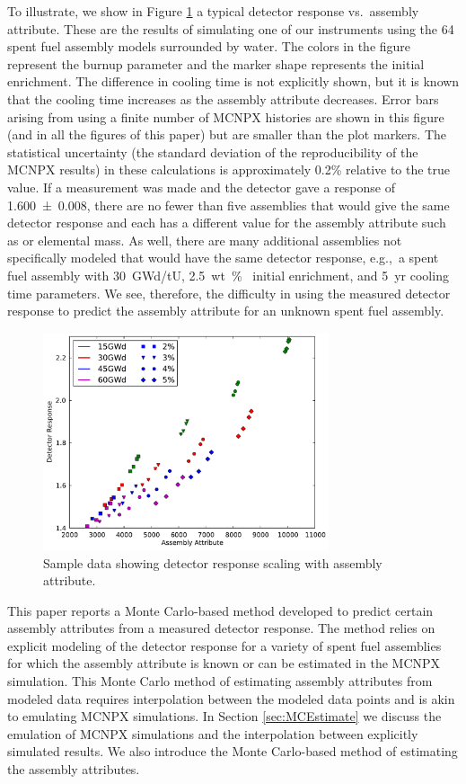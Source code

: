 \documentclass{ansnse}
\begin{document}
To illustrate, we show in Figure \ref{fig:Example} a typical detector response vs.\ assembly attribute.  These are the results of simulating one of our instruments using the 64 spent fuel assembly models surrounded by water.  The colors in the figure represent the burnup parameter and the marker shape represents the initial enrichment.  The difference in cooling time is not explicitly shown, but it is known that the cooling time increases as the assembly attribute decreases.  Error bars arising from using a finite number of MCNPX histories are shown in this figure (and in all the figures of this paper) but are smaller than the plot markers.  The statistical uncertainty (the standard deviation of the reproducibility of the MCNPX results) in these calculations is approximately 0.2\% relative to the true value.  If a measurement was made and the detector gave a response of \num{1.600(8)}, there are no fewer than five assemblies that would give the same detector response and each has a different value for the assembly attribute such as  or elemental  mass.  As well, there are many additional assemblies not specifically modeled that would have the same detector response, e.g.,\ a spent fuel assembly with \SI{30}{GWd/tU}, \SI{2.5}{wt \% } initial enrichment, and \SI{5}{yr} cooling time parameters.  We see, therefore, the difficulty in using the measured detector response to predict the assembly attribute for an unknown spent fuel assembly.
\begin{figure}[h]\centering
    \includegraphics[width=0.75\textwidth, keepaspectratio]{Figures/Plain/PNARH2O}
    \caption{Sample data showing detector response scaling with assembly attribute.}
    \label{fig:Example}
\end{figure}

This paper reports a Monte Carlo-based method developed to predict certain assembly attributes from a measured detector response.  The method relies on explicit modeling of the detector response for a variety of spent fuel assemblies for which the assembly attribute is known or can be estimated in the MCNPX simulation.  This Monte Carlo method of estimating assembly attributes from modeled data requires interpolation between the modeled data points and is akin to emulating MCNPX simulations.  In Section \ref{sec:MCEstimate} we discuss the emulation of MCNPX simulations and the interpolation between explicitly simulated results.  We also introduce the Monte Carlo-based method of estimating the assembly attributes.
\end{document}
